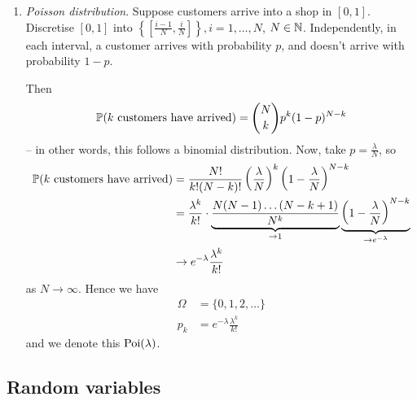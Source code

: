\documentclass{../template/note}
\begin{document}
\begin{enumerate}[label=\protect\circled{\arabic*}]
        \begin{align*}
            \Omega &= \{1, 2, \dots\} \\
            p_k &= (1-p)^{k-1}p
        \end{align*}
        Alternatively, we might want to model the probability that we see \(k\) tails before the first heads:
        \begin{align*}
            \Omega &= \{0, 1, \dots\} \\
            p_k' &= (1-p)^kp
        \end{align*}
        \item \emph{Poisson distribution}. Suppose customers arrive into a shop in \([0, 1]\). Discretise \([0, 1]\) into \(\left\{\left[\frac{i-1}{N}, \frac{i}{N}\right]\right\}, i = 1, \dots, N\), \(N \in \mathbb N\). Independently, in each interval, a customer arrives with probability \(p\), and doesn't arrive with probability \(1-p\).
        
        Then
        \begin{align*}
            \mathbb P(k \text{ customers have arrived}) = \binom N k p^k (1-p)^{N-k}
        \end{align*}
        -- in other words, this follows a binomial distribution. Now, take \(p = \frac{\lambda} N\), so
        \begin{align*}
            \mathbb P(k \text{ customers have arrived}) &= \frac{N!}{k!(N-k)!}\left(\frac{\lambda}{N}\right)^k\left(1-\frac{\lambda}{N}\right)^{N-k} \\
            &= \frac{\lambda^k}{k!} \cdot \underbrace{\frac{N(N-1)\dots(N-k+1)}{N^k}}_{\to 1} \underbrace{\left(1-\frac{\lambda}{N}\right)^{N-k}}_{\to e^{-\lambda}} \\
            &\to e^{-\lambda}\frac{\lambda^k}{k!}
        \end{align*}
        as \(N \to \infty\). Hence we have
        \begin{align*}
            \Omega &= \{0, 1, 2, \dots\} \\
            p_k &= e^{-\lambda}\frac{\lambda^k}{k!}
        \end{align*}
        and we denote this \(\operatorname{Poi}(\lambda)\).
    \end{enumerate}
    
    \subsection{Random variables}
\end{document}
